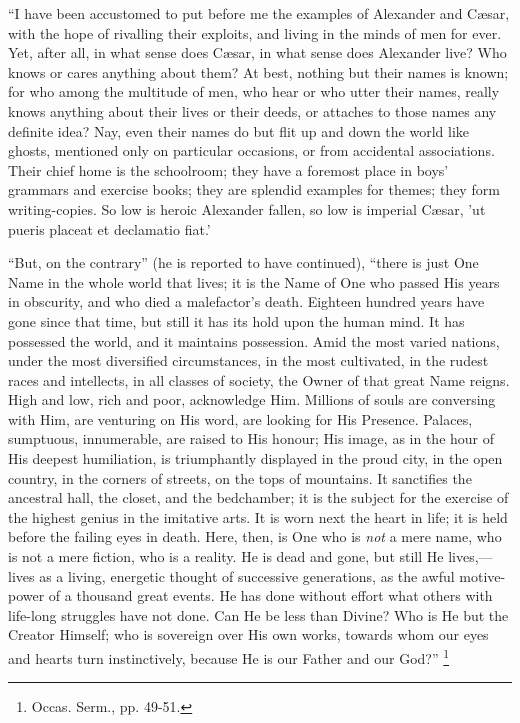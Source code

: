 ``I have been accustomed to put
before me the examples of Alexander and Cæsar, with the hope of
rivalling their exploits, and living in the minds of men for ever.
Yet, after all, in what sense does Cæsar, in what sense does
Alexander live? Who knows or cares anything about them? At best,
nothing but their names is known; for who among the multitude of men,
who hear or who utter their names, really knows anything about their
lives or their deeds, or attaches to those names any definite idea?
Nay, even their names do but flit up and down the world like ghosts,
mentioned only on particular occasions, or from accidental
associations. Their chief home is the schoolroom; they have a foremost
place in boys' grammars and exercise books; they are splendid examples
for themes; they form writing-copies. So low is heroic Alexander
fallen, so low is imperial Cæsar, 'ut pueris placeat et declamatio
fiat.'

``But, on the contrary'' (he is reported to have
continued), ``there is just One Name in the whole world that
lives; it is the Name of One who passed His years in obscurity, and
who died a malefactor's death. Eighteen hundred years have gone since
that time, but still it has its hold upon the human mind. It has
possessed the world, and it maintains possession. Amid the most varied
nations, under the most diversified circumstances, in the most cultivated, in the rudest races and intellects, in all classes of
society, the Owner of that great Name reigns. High and low, rich and
poor, acknowledge Him. Millions of souls are conversing with Him, are
venturing on His word, are looking for His Presence. Palaces,
sumptuous, innumerable, are raised to His honour; His image, as in the
hour of His deepest humiliation, is triumphantly displayed in the
proud city, in the open country, in the corners of streets, on the
tops of mountains. It sanctifies the ancestral hall, the closet, and
the bedchamber; it is the subject for the exercise of the highest
genius in the imitative arts. It is worn next the heart in life; it is
held before the failing eyes in death. Here, then, is One who is \emph{not} a
mere name, who is not a mere fiction, who is a reality. He is dead and
gone, but still He lives,—lives as a living, energetic thought of
successive generations, as the awful motive-power of a thousand great
events. He has done without effort what others with life-long
struggles have not done. Can He be less than Divine? Who is He but the
Creator Himself; who is sovereign over His own works, towards whom our
eyes and hearts turn instinctively, because He is our Father and our
God?'' \footnote{Occas.
Serm.,
pp. 49-51.}

